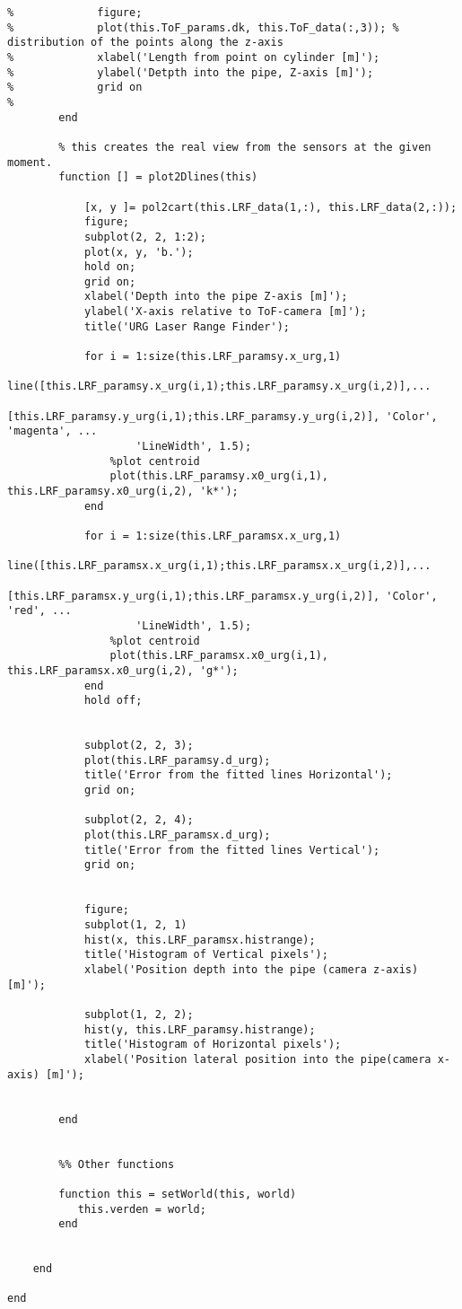 \begin{lstlisting}
%             figure;
%             plot(this.ToF_params.dk, this.ToF_data(:,3)); % distribution of the points along the z-axis
%             xlabel('Length from point on cylinder [m]');
%             ylabel('Detpth into the pipe, Z-axis [m]');
%             grid on
%             
        end
        
        % this creates the real view from the sensors at the given moment.
        function [] = plot2Dlines(this)
            
            [x, y ]= pol2cart(this.LRF_data(1,:), this.LRF_data(2,:));
            figure;
            subplot(2, 2, 1:2);
            plot(x, y, 'b.');
            hold on;
            grid on;
            xlabel('Depth into the pipe Z-axis [m]');
            ylabel('X-axis relative to ToF-camera [m]');
            title('URG Laser Range Finder');
            
            for i = 1:size(this.LRF_paramsy.x_urg,1)
                line([this.LRF_paramsy.x_urg(i,1);this.LRF_paramsy.x_urg(i,2)],...
                    [this.LRF_paramsy.y_urg(i,1);this.LRF_paramsy.y_urg(i,2)], 'Color', 'magenta', ...
                    'LineWidth', 1.5);
                %plot centroid
                plot(this.LRF_paramsy.x0_urg(i,1), this.LRF_paramsy.x0_urg(i,2), 'k*');
            end
            
            for i = 1:size(this.LRF_paramsx.x_urg,1)
                line([this.LRF_paramsx.x_urg(i,1);this.LRF_paramsx.x_urg(i,2)],...
                    [this.LRF_paramsx.y_urg(i,1);this.LRF_paramsx.y_urg(i,2)], 'Color', 'red', ...
                    'LineWidth', 1.5);
                %plot centroid
                plot(this.LRF_paramsx.x0_urg(i,1), this.LRF_paramsx.x0_urg(i,2), 'g*');
            end
            hold off;
            
            
            subplot(2, 2, 3);
            plot(this.LRF_paramsy.d_urg);
            title('Error from the fitted lines Horizontal');
            grid on;
            
            subplot(2, 2, 4);
            plot(this.LRF_paramsx.d_urg);
            title('Error from the fitted lines Vertical');
            grid on;
            
            
            figure;
            subplot(1, 2, 1)
            hist(x, this.LRF_paramsx.histrange);
            title('Histogram of Vertical pixels');
            xlabel('Position depth into the pipe (camera z-axis) [m]');
            
            subplot(1, 2, 2);
            hist(y, this.LRF_paramsy.histrange);
            title('Histogram of Horizontal pixels');
            xlabel('Position lateral position into the pipe(camera x-axis) [m]');
            
            
        end
        
        
        %% Other functions
        
        function this = setWorld(this, world)
           this.verden = world; 
        end
        
        
    end
    
end
\end{lstlisting}


